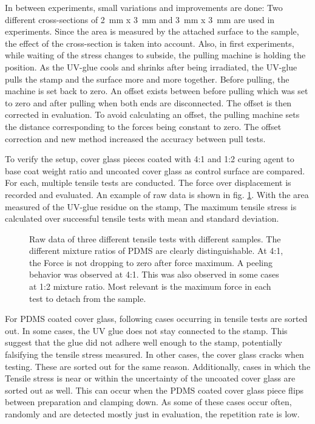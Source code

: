 In between experiments, small variations and improvements are done: Two different cross-sections of \SI{2}{\milli\meter} x \SI{3}{\milli\meter} and \SI{3}{\milli\meter} x \SI{3}{\milli\meter} are used in experiments. Since the area is measured by the attached surface to the sample, the effect of the cross-section is taken into account. Also, in first experiments, while waiting of the stress changes to subside, the pulling machine is holding the position. As the UV-glue cools and shrinks after being irradiated, the UV-glue pulls the stamp and the surface more and more together. Before pulling, the machine is set back to zero. An offset exists between before pulling which was set to zero and after pulling when both ends are disconnected. The offset is then corrected in evaluation. To avoid calculating an offset, the pulling machine sets the distance corresponding to the forces being constant to zero. The offset correction and new method increased the accuracy between pull tests.

To verify the setup, cover glass pieces coated with 4:1 and 1:2 curing agent to base coat weight ratio and uncoated cover glass as control surface are compared. For each, multiple tensile tests are conducted. The force over displacement is recorded and evaluated. An example of raw data is shown in fig. \ref{fig:forceOverTime}. With the area measured of the UV-glue residue on the stamp, The maximum tensile stress is calculated over successful tensile tests with mean and standard deviation.  

\begin{figure}[hbt!]
	\centering
	
	\caption{Raw data of three different tensile tests with different samples. The different mixture ratios of PDMS are clearly distinguishable. At 4:1, the Force is not dropping to zero after force maximum. A peeling behavior was observed at 4:1. This was also observed in some cases at 1:2 mixture ratio. Most relevant is the maximum force in each test to detach from the sample.}
	\label{fig:forceOverTime}
\end{figure}

For PDMS coated cover glass, following cases occurring in tensile tests are sorted out. In some cases, the UV glue does not stay connected to the stamp. This suggest that the glue did not adhere well enough to the stamp, potentially falsifying the tensile stress measured. In other cases, the cover glass cracks when testing. These are sorted out for the same reason. Additionally, cases in which the Tensile stress is near or within the uncertainty of the uncoated cover glass are sorted out as well. This can occur when the PDMS coated cover glass piece flips between preparation and clamping down. As some of these cases occur often, randomly and are detected mostly just in evaluation, the repetition rate is low.


